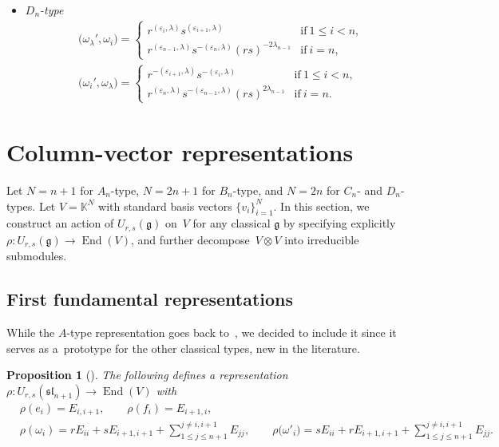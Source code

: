 \documentclass[pdftex]{sigma}
\numberwithin{equation}{section}
\newtheorem{Proposition}[Theorem]{Proposition}
 { \theoremstyle{definition}
\newtheorem{Definition}[Theorem]{Definition}
\newtheorem{Note}[Theorem]{Note}
\newtheorem{Example}[Theorem]{Example}
\newtheorem{Remark}[Theorem]{Remark} }
\DeclareMathOperator{\End}{End}
\newcommand{\fg}{\mathfrak{g}}
\newcommand{\ssl}{\mathfrak{sl}}
\newcommand{\uu}{U_{r,s}(\fg)}
\begin{document}
\begin{itemize}
\item
\emph{$D_{n}$-type}
\begin{align*}
 &\bigl(\omega_{\lambda}',\omega_{i}\bigr)=
 \begin{cases}
 r^{( \varepsilon_{i},\lambda )}s^{( \varepsilon_{i + 1},\lambda )}
 & \mathrm{if}\ 1\leq i<n, \\
 r^{( \varepsilon_{n-1},\lambda)}s^{-(\varepsilon_{n},\lambda)}(rs)^{-2\lambda_{n - 1}}
 & \mathrm{if}\ i = n,
 \end{cases} \\
 &\bigl(\omega_{i}',\omega_{\lambda}\bigr)=
 \begin{cases}
 r^{-( \varepsilon_{i + 1},\lambda )}s^{-(\varepsilon_{i},\lambda )}
 & \mathrm{if}\ 1\leq i<n ,\\
 r^{( \varepsilon_{n},\lambda )}s^{-(\varepsilon_{n-1},\lambda )}(rs)^{2\lambda_{n-1}}
 & \mathrm{if}\ i = n.
\end{cases}
\end{align*}
\end{itemize}

\section{Column-vector representations}\label{sec:column_repr}

Let $N=n+1$ for $A_n$-type, $N=2n+1$ for $B_n$-type, and $N=2n$ for $C_n$- and $D_n$-types. Let $V = \mathbb{K}^{N}$ with standard basis vectors $\{v_i\}_{i=1}^N$. In this section, we construct an action of $\uu$ on~$V$ for any classical $\fg$ by specifying explicitly $\rho\colon \uu \to \End(V)$, and further decom\-pose~${V\otimes V}$ into irreducible submodules.

\subsection{First fundamental representations}%

While the $A$-type representation goes back to~\cite{BW2}, we decided to include it since it serves as a~prototype for the other classical types, new in the literature.

\begin{Proposition}[{\cite[Section~1]{BW2}}]\label{prp:A_rep}
The following defines a representation $\rho\colon  U_{r,s}(\ssl_{n+1})\to \End(V)$ with
\begin{align*}
 & \rho(e_{i}) = E_{i,i+1} , \qquad \rho(f_{i}) = E_{i+1,i} , \\
 & \rho(\omega_{i}) =
 rE_{ii} + sE_{i+1,i+1} + \sum_{1\leq j\leq n+1}^{j\ne i,i+1} E_{jj} , \qquad
 \rho\bigl(\omega'_{i}\bigr) =
 sE_{ii} + rE_{i+1,i+1} + \sum_{1\leq j\leq n+1}^{j \neq i,i + 1} E_{jj} .
\end{align*}
\end{Proposition}
\end{document}
